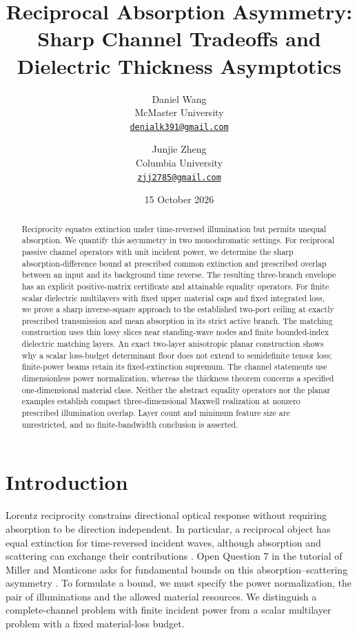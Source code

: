 \documentclass[11pt,a4paper]{article}
\title{Reciprocal Absorption Asymmetry:\\Sharp Channel Tradeoffs and Dielectric Thickness Asymptotics}
\author{Daniel Wang\\McMaster University\\\href{mailto:denialk391@gmail.com}{\texttt{denialk391@gmail.com}}
\and Junjie Zheng\\Columbia University\\\href{mailto:zjj2785@gmail.com}{\texttt{zjj2785@gmail.com}}}
\date{15 October 2026}
\theoremstyle{remark}
\begin{document}
\maketitle
\begin{abstract}
Reciprocity equates extinction under time-reversed illumination but permits unequal absorption. We quantify this asymmetry in two monochromatic settings. For reciprocal passive channel operators with unit incident power, we determine the sharp absorption-difference bound at prescribed common extinction and prescribed overlap between an input and its background time reverse. The resulting three-branch envelope has an explicit positive-matrix certificate and attainable equality operators. For finite scalar dielectric multilayers with fixed upper material caps and fixed integrated loss, we prove a sharp inverse-square approach to the established two-port ceiling at exactly prescribed transmission and mean absorption in its strict active branch. The matching construction uses thin lossy slices near standing-wave nodes and finite bounded-index dielectric matching layers. An exact two-layer anisotropic planar construction shows why a scalar loss-budget determinant floor does not extend to semidefinite tensor loss; finite-power beams retain its fixed-extinction supremum. The channel statements use dimensionless power normalization, whereas the thickness theorem concerns a specified one-dimensional material class. Neither the abstract equality operators nor the planar examples establish compact three-dimensional Maxwell realization at nonzero prescribed illumination overlap. Layer count and minimum feature size are unrestricted, and no finite-bandwidth conclusion is asserted.
\end{abstract}

\section{Introduction}
Lorentz reciprocity constrains directional optical response without requiring absorption to be direction independent. In particular, a reciprocal object has equal extinction for time-reversed incident waves, although absorption and scattering can exchange their contributions \citep{SounasAlu2014}. Open Question 7 in the tutorial of Miller and Monticone asks for fundamental bounds on this absorption--scattering asymmetry \citep{MillerMonticone2026}. To formulate a bound, we must specify the power normalization, the pair of illuminations and the allowed material resources. We distinguish a complete-channel problem with finite incident power from a scalar multilayer problem with a fixed material-loss budget.
\end{document}
